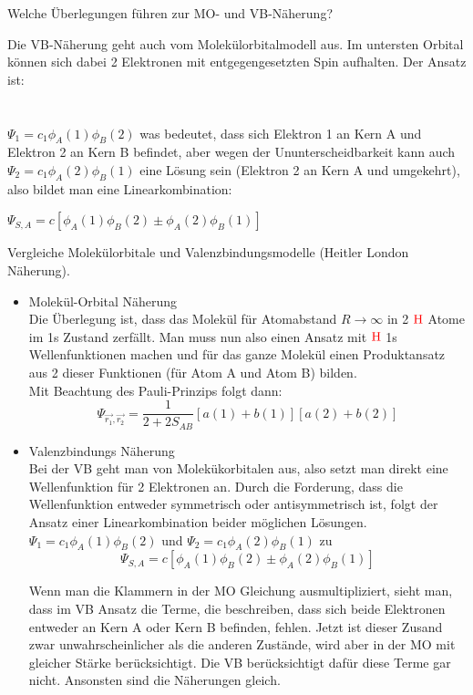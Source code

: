 \documentclass[a5paper,12pt,ngerman,print,grid=front]{kartei}
\let\oldce\ce
\renewcommand*{\ce}[1]{\begingroup\color{red}\oldce{#1}\endgroup}
\begin{document}
\begin{karte}{
		Welche Überlegungen führen zur MO- und VB-Näherung?
		}
\begin{itemize}
		Die VB-Näherung geht auch vom Molekülorbitalmodell aus. 
		Im untersten Orbital können sich dabei 2 Elektronen mit entgegengesetzten Spin aufhalten. 
		Der Ansatz ist: \\ \\ \\
		$\Psi_1 = c_1 \phi_A(1) \phi_B(2)$ 
		was bedeutet, dass sich Elektron 1 an Kern A und Elektron 2 an Kern B befindet, 
		aber wegen der Ununterscheidbarkeit kann auch 
		$\Psi_2 = c_1 \phi_A(2) \phi_B(1)$
		eine Lösung sein (Elektron 2 an Kern A und umgekehrt), also bildet man eine Linearkombination:
		 
		$\Psi_{S,A} = c[ \phi_A(1) \phi_B(2) \pm \phi_A(2) \phi_B(1) ] $ 
			 
			
		\end{itemize}
		
	\end{karte}
		
		
	\begin{karte}{
		Vergleiche Molekülorbitale und Valenzbindungsmodelle (Heitler London Näherung).
		}
		
		\begin{itemize}
			\item Molekül-Orbital Näherung \\
			
			Die Überlegung ist, dass das Molekül für Atomabstand $R \rightarrow \infty$ in 2 
			$\ce{H}$ Atome im 1s Zustand zerfällt. 
			Man muss nun also einen Ansatz mit $\ce{H}$ 1s Wellenfunktionen machen und für 
			das ganze Molekül einen Produktansatz aus 2 dieser Funktionen 
			(für Atom A und Atom B) bilden. \\
			Mit Beachtung des Pauli-Prinzips folgt dann:
			$$\Psi_{\overrightarrow{r_1},\overrightarrow{r_2}} = 
			\frac{1}{2+2S_{AB}}[a(1)+b(1)][a(2)+b(2)]$$
			
			\item Valenzbindungs Näherung \\
			 
			 Bei der VB geht man von Molekükorbitalen aus, also setzt man direkt eine Wellenfunktion für 2 Elektronen an. Durch die Forderung, dass die Wellenfunktion entweder symmetrisch oder antisymmetrisch ist, folgt der Ansatz einer Linearkombination beider möglichen Lösungen.
			 $ \Psi_1 = c_1\phi_A(1)\phi_B(2) $ und $ \Psi_2 = c_1\phi_A(2)\phi_B(1) $ zu
			 $$  \Psi_{S,A} = c \left[   \phi_A(1) \phi_B(2) \pm   \phi_A(2) \phi_B(1)   \right]  $$
			 
			 Wenn man die Klammern in der MO Gleichung ausmultipliziert, sieht man, dass im VB Ansatz die Terme, die beschreiben, dass sich beide Elektronen entweder an Kern A oder Kern B befinden, fehlen.
			 Jetzt ist dieser Zusand zwar unwahrscheinlicher als die anderen Zustände, wird aber in der MO mit gleicher Stärke berücksichtigt. Die VB berücksichtigt dafür diese Terme gar nicht.
			 Ansonsten sind die Näherungen gleich.
			
		\end{itemize}
		
	\end{karte}
	
\end{document}
